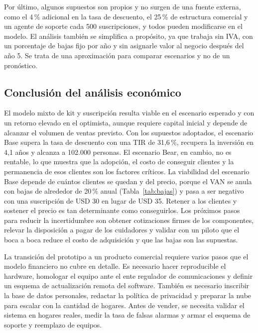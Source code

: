 Por último, algunos supuestos son propios y no surgen de una fuente externa, como el 4\,\% adicional en la tasa de descuento, el 25\,\% de estructura comercial y un agente de soporte cada 500 suscripciones, y todos pueden modificarse en el modelo.
El análisis también se simplifica a propósito, ya que trabaja sin IVA, con un porcentaje de bajas fijo por año y sin asignarle valor al negocio después del año 5.
Se trata de una aproximación para comparar escenarios y no de un pronóstico.

\subsection{Conclusión del análisis económico}

El modelo mixto de kit y suscripción resulta viable en el escenario esperado y con un retorno elevado en el optimista, aunque requiere capital inicial y depende de alcanzar el volumen de ventas previsto.
Con los supuestos adoptados, el escenario Base supera la tasa de descuento con una TIR de 31,6\,\%, recupera la inversión en 4,1 años y alcanza a 102.000 personas.
El escenario Bear, en cambio, no es rentable, lo que muestra que la adopción, el costo de conseguir clientes y la permanencia de esos clientes son los factores críticos.
La viabilidad del escenario Base depende de cuántos clientes se quedan y del precio, porque el VAN se anula con bajas de alrededor de 20\,\% anual (Tabla~\ref{tab:bajas}) y pasa a ser negativo con una suscripción de USD 30 en lugar de USD 35.
Retener a los clientes y sostener el precio es tan determinante como conseguirlos.
Los próximos pasos para reducir la incertidumbre son obtener cotizaciones firmes de los componentes, relevar la disposición a pagar de los cuidadores y validar con un piloto que el boca a boca reduce el costo de adquisición y que las bajas son las supuestas.

La transición del prototipo a un producto comercial requiere varios pasos que el modelo financiero no cubre en detalle.
Es necesario hacer reproducible el hardware, homologar el equipo ante el ente regulador de comunicaciones y definir un esquema de actualización remota del software.
También es necesario inscribir la base de datos personales, redactar la política de privacidad y preparar la nube para escalar con la cantidad de hogares.
Antes de vender, se necesita validar el sistema en hogares reales, medir la tasa de falsas alarmas y armar el esquema de soporte y reemplazo de equipos.


\newcommand{\marca}{Lares}
\newcommand{\modcont}{Lar}   %
\newcommand{\modcam}{Vela}    %

